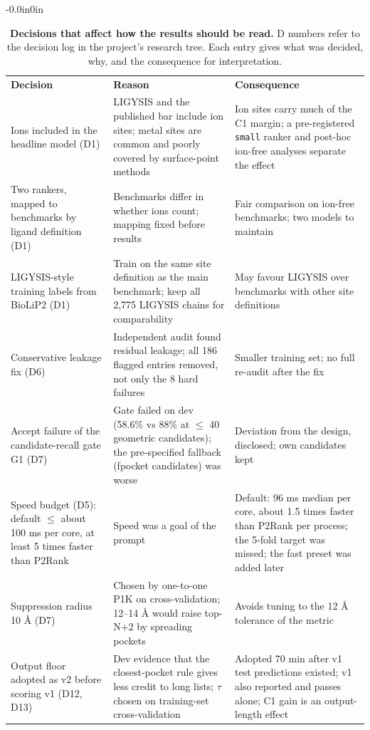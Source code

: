 \documentclass[10pt,letterpaper]{article}
\newlength\savedwidth
\newcommand\thickhline{\noalign{\global\savedwidth\arrayrulewidth\global\arrayrulewidth 2pt}%
\hline
\noalign{\global\arrayrulewidth\savedwidth}}
\begin{document}
\begin{table}[!ht]
\begin{adjustwidth}{-0.0in}{0in}
\centering
\caption{{\bf Decisions that affect how the results should be read.} D numbers refer to the decision log in the project's research tree. Each entry gives what was decided, why, and the consequence for interpretation.}
\label{table_decisions}
{\footnotesize
\begin{tabular}{p{3.2cm}p{5.7cm}p{5.8cm}}
\hline
\textbf{Decision} & \textbf{Reason} & \textbf{Consequence} \\ \thickhline
Ions included in the headline model (D1) & LIGYSIS and the published bar include ion sites; metal sites are common and poorly covered by surface-point methods & Ion sites carry much of the C1 margin; a pre-registered \texttt{small} ranker and post-hoc ion-free analyses separate the effect \\ \hline
Two rankers, mapped to benchmarks by ligand definition (D1) & Benchmarks differ in whether ions count; mapping fixed before results & Fair comparison on ion-free benchmarks; two models to maintain \\ \hline
LIGYSIS-style training labels from BioLiP2 (D1) & Train on the same site definition as the main benchmark; keep all 2,775 LIGYSIS chains for comparability & May favour LIGYSIS over benchmarks with other site definitions \\ \hline
Conservative leakage fix (D6) & Independent audit found residual leakage; all 186 flagged entries removed, not only the 8 hard failures & Smaller training set; no full re-audit after the fix \\ \hline
Accept failure of the candidate-recall gate G1 (D7) & Gate failed on dev (58.6\% vs 88\% at $\le$ 40 geometric candidates); the pre-specified fallback (fpocket candidates) was worse & Deviation from the design, disclosed; own candidates kept \\ \hline
Speed budget (D5): default $\le$ about 100 ms per core, at least 5 times faster than P2Rank & Speed was a goal of the prompt & Default: 96 ms median per core, about 1.5 times faster than P2Rank per process; the 5-fold target was missed; the fast preset was added later \\ \hline
Suppression radius 10 \AA{} (D7) & Chosen by one-to-one P1K on cross-validation; 12--14 \AA{} would raise top-N+2 by spreading pockets & Avoids tuning to the 12 \AA{} tolerance of the metric \\ \hline
Output floor adopted as v2 before scoring v1 (D12, D13) & Dev evidence that the closest-pocket rule gives less credit to long lists; $\tau$ chosen on training-set cross-validation & Adopted 70 min after v1 test predictions existed; v1 also reported and passes alone; C1 gain is an output-length effect \\ \hline

\end{tabular}}
\end{adjustwidth}
\end{table}
\end{document}
